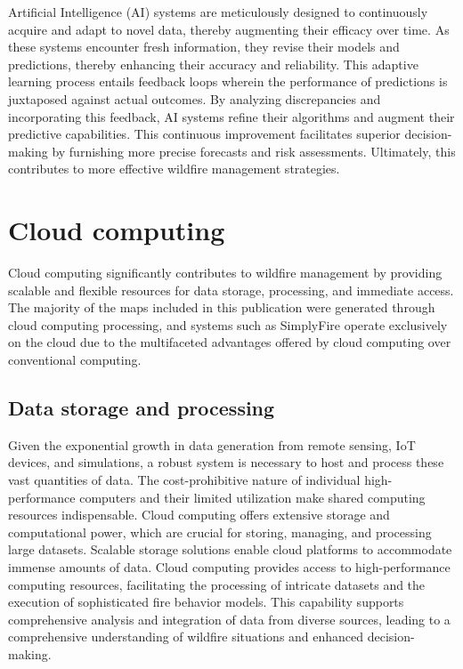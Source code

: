 \documentclass[
  12 pt,
]{Nemilov}
\begin{document}
Artificial Intelligence (AI) systems are meticulously designed to continuously acquire and adapt to novel data, thereby augmenting their efficacy over time. As these systems encounter fresh information, they revise their models and predictions, thereby enhancing their accuracy and reliability. This adaptive learning process entails feedback loops wherein the performance of predictions is juxtaposed against actual outcomes. By analyzing discrepancies and incorporating this feedback, AI systems refine their algorithms and augment their predictive capabilities. This continuous improvement facilitates superior decision-making by furnishing more precise forecasts and risk assessments. Ultimately, this contributes to more effective wildfire management strategies.

\section{Cloud computing}\label{cloud-computing}

Cloud computing significantly contributes to wildfire management by providing scalable and flexible resources for data storage, processing, and immediate access. The majority of the maps included in this publication were generated through cloud computing processing, and systems such as SimplyFire operate exclusively on the cloud due to the multifaceted advantages offered by cloud computing over conventional computing.

\subsection{Data storage and processing}\label{data-storage-and-processing}

Given the exponential growth in data generation from remote sensing, IoT devices, and simulations, a robust system is necessary to host and process these vast quantities of data. The cost-prohibitive nature of individual high-performance computers and their limited utilization make shared computing resources indispensable. Cloud computing offers extensive storage and computational power, which are crucial for storing, managing, and processing large datasets. Scalable storage solutions enable cloud platforms to accommodate immense amounts of data. Cloud computing provides access to high-performance computing resources, facilitating the processing of intricate datasets and the execution of sophisticated fire behavior models. This capability supports comprehensive analysis and integration of data from diverse sources, leading to a comprehensive understanding of wildfire situations and enhanced decision-making.
\end{document}
